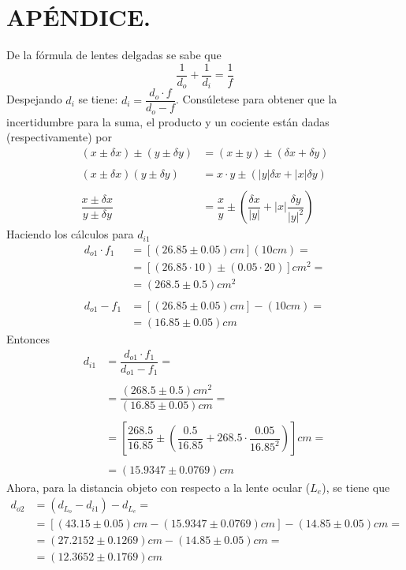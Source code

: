 \documentclass[10pt,a4paper]{article}
\begin{document}
\section{APÉNDICE.} %
\label{sec:apendice}
De la fórmula de lentes delgadas se sabe que
$$\dfrac{1}{d_o}+\dfrac{1}{d_i}=\dfrac{1}{f}$$
Despejando $ d_i $ se tiene: $d_i=\dfrac{d_o\cdot f}{d_o-f}$.
Consúletese  para obtener que la incertidumbre para la suma, el producto y un cociente están dadas (respectivamente) por
\begin{align*}
	(x\pm \delta x)\pm(y\pm \delta y)&=(x\pm y)\pm(\delta x+\delta y)\\\\
	(x\pm\delta x)(y\pm\delta y)&=x\cdot y\pm\left(|y|\delta x+|x|\delta y \right)\\\\
	\dfrac{x\pm\delta x}{y\pm\delta y}&=\dfrac{x}{y}\pm\left(\dfrac{\delta x}{|y|}+|x|\dfrac{\delta y}{|y|^2}\right)
\end{align*}
Haciendo los cálculos para $ d_{i1} $
\begin{align*}
	d_{o1}\cdot f_1&=[(26.85\pm 0.05)cm](10cm)=\\	&=[(26.85\cdot10)\pm(0.05\cdot20)]cm^2=\\
	&=(268.5\pm0.5)cm^2\\\\
	d_{o1}-f_1&=[(26.85\pm 0.05)cm]-(10cm)=\\
	&=(16.85\pm0.05) cm
\end{align*}
Entonces
\begin{align*}
	d_{i1}&=\dfrac{d_{o1}\cdot f_1}{d_{o1}-f_1}=\\\\
	&=\dfrac{(268.5\pm0.5)cm^2}{(16.85\pm0.05) cm}=\\\\
	&=\left[\dfrac{268.5}{16.85}\pm\left(\dfrac{0.5}{16.85}+
	268.5\cdot\dfrac{0.05}{16.85^2}\right)\right]cm=\\\\
	&=(15.9347\pm0.0769)cm
\end{align*}
Ahora, para la distancia objeto con respecto a la lente ocular ($ L_e $), se tiene que
\begin{align*}
	d_{o2}&=(d_{L_o}-d_{i1})-d_{L_e}=\\
	&=[(43.15\pm0.05)cm-(15.9347\pm0.0769)cm]-(14.85\pm0.05)cm=\\
	&=(27.2152\pm0.1269)cm-(14.85\pm0.05)cm=\\
	&=(12.3652\pm0.1769)cm
\end{align*} 
\end{document}

